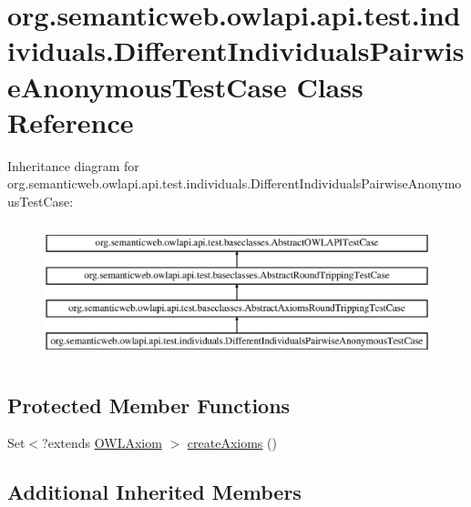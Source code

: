 \hypertarget{classorg_1_1semanticweb_1_1owlapi_1_1api_1_1test_1_1individuals_1_1_different_individuals_pairwise_anonymous_test_case}{\section{org.\-semanticweb.\-owlapi.\-api.\-test.\-individuals.\-Different\-Individuals\-Pairwise\-Anonymous\-Test\-Case Class Reference}
\label{classorg_1_1semanticweb_1_1owlapi_1_1api_1_1test_1_1individuals_1_1_different_individuals_pairwise_anonymous_test_case}
}
Inheritance diagram for org.\-semanticweb.\-owlapi.\-api.\-test.\-individuals.\-Different\-Individuals\-Pairwise\-Anonymous\-Test\-Case\-:\begin{figure}[H]
\begin{center}
\leavevmode
\includegraphics[height=4.000000cm]{classorg_1_1semanticweb_1_1owlapi_1_1api_1_1test_1_1individuals_1_1_different_individuals_pairwise_anonymous_test_case}
\end{center}
\end{figure}
\subsection*{Protected Member Functions}
\begin{DoxyCompactItemize}
\item 
Set$<$?extends \hyperlink{interfaceorg_1_1semanticweb_1_1owlapi_1_1model_1_1_o_w_l_axiom}{O\-W\-L\-Axiom} $>$ \hyperlink{classorg_1_1semanticweb_1_1owlapi_1_1api_1_1test_1_1individuals_1_1_different_individuals_pairwise_anonymous_test_case_a8a27f1b6df66a4355b222afe10f17418}{create\-Axioms} ()
\end{DoxyCompactItemize}
\subsection*{Additional Inherited Members}


